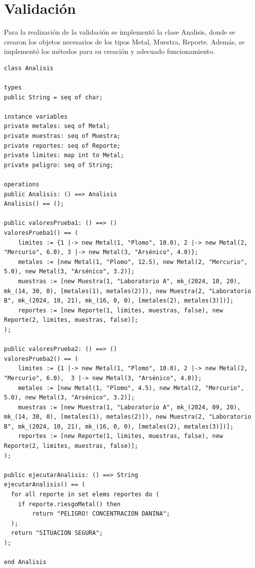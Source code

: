 \section{Validación}
Para la realización de la validación se implementó la clase Analisis, donde se crearon los objetos necesarios de los tipos Metal, Muestra, Reporte. Además, se implementó los métodos para su creación y adecuado funcionamiento.

\begin{lstlisting}
class Analisis

types
public String = seq of char;

instance variables
private metales: seq of Metal;
private muestras: seq of Muestra;
private reportes: seq of Reporte;
private limites: map int to Metal;
private peligro: seq of String;

operations
public Analisis: () ==> Analisis
Analisis() == ();

public valoresPrueba1: () ==> () 
valoresPrueba1() == (
	limites := {1 |-> new Metal(1, "Plomo", 10.0), 2 |-> new Metal(2, "Mercurio", 6.0), 3 |-> new Metal(3, "Arsénico", 4.0)};
	metales := [new Metal(1, "Plomo", 12.5), new Metal(2, "Mercurio", 5.0), new Metal(3, "Arsénico", 3.2)];
	muestras := [new Muestra(1, "Laboratorio A", mk_(2024, 10, 20), mk_(14, 30, 0), [metales(1), metales(2)]), new Muestra(2, "Laboratorio B", mk_(2024, 10, 21), mk_(16, 0, 0), [metales(2), metales(3)])];
	reportes := [new Reporte(1, limites, muestras, false), new Reporte(2, limites, muestras, false)];
);

public valoresPrueba2: () ==> () 
valoresPrueba2() == (
	limites := {1 |-> new Metal(1, "Plomo", 10.0), 2 |-> new Metal(2, "Mercurio", 6.0),  3 |-> new Metal(3, "Arsénico", 4.0)};
	metales := [new Metal(1, "Plomo", 4.5), new Metal(2, "Mercurio", 5.0), new Metal(3, "Arsénico", 3.2)];
	muestras := [new Muestra(1, "Laboratorio A", mk_(2024, 09, 20), mk_(14, 30, 0), [metales(1), metales(2)]), new Muestra(2, "Laboratorio B", mk_(2024, 10, 21), mk_(16, 0, 0), [metales(2), metales(3)])];
	reportes := [new Reporte(1, limites, muestras, false), new Reporte(2, limites, muestras, false)];
);

public ejecutarAnalisis: () ==> String
ejecutarAnalisis() == (
  for all reporte in set elems reportes do (
    if reporte.riesgoMetal() then
		return "PELIGRO! CONCENTRACION DANINA";
  );
  return "SITUACION SEGURA";
);

end Analisis
\end{lstlisting}


